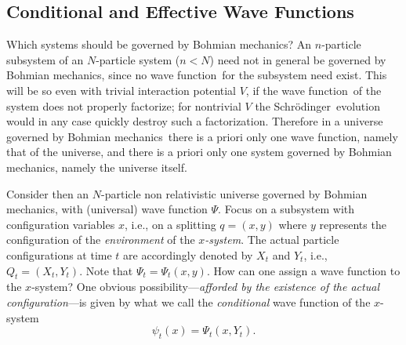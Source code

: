 \documentclass[12pt]{article}
\newcommand{\Sc}{Schr\"{o}dinger}
\newcommand{\BM}{Bohmian mechanics}
\newcommand{\wf}{wave function}
\begin{document}
\subsection{Conditional and Effective Wave Functions}
\label{sec:CEWF}
Which systems should be governed by \BM ?  An $n$-particle subsystem
of an $N$-particle system ($n<N$) need not in general be governed by
\BM, since no \wf\ for the subsystem need exist.  This will be so even
with trivial interaction potential $V$, if the \wf\ of the system does
not properly factorize; for nontrivial $V$ the \Sc\ evolution would in
any case quickly destroy such a factorization.  Therefore in a
universe governed by \BM\ there is a priori only one wave function,
namely that of the universe, and there is a priori only one system
governed by \BM, namely the universe itself.

Consider then an $N$-particle non relativistic universe governed by
\BM{}, with (universal) \wf{} $\Psi$.  Focus on a subsystem with
configuration variables $x$, i.e., on a splitting $q=(x,y)$ where $y$
represents the configuration of the \emph{environment} of the
\emph{$x$-system}.  The actual particle configurations at time $t$ are
accordingly denoted by $X_t$ and $Y_t$, i.e., $Q_t=(X_t ,Y_t)$.  Note
that $\Psi_t=\Psi_t(x,y)$.  How can one assign a \wf{} to the
$x$-system?  One obvious possibility---\emph{afforded by the existence
   of the actual configuration}---is given by what we call the
\emph{conditional} wave function of the $x$-system
%
\begin{equation}
\psi_t(x) = \Psi_t (x,Y_t).
\label{eq:con}
\end{equation}
\end{document}
